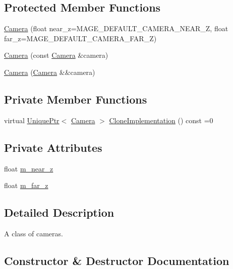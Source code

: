 \subsection*{Protected Member Functions}
\begin{DoxyCompactItemize}
\item 
\hyperlink{classmage_1_1_camera_ae734b9b92203a384410e83f117fa4427}{Camera} (float near\+\_\+z=M\+A\+G\+E\+\_\+\+D\+E\+F\+A\+U\+L\+T\+\_\+\+C\+A\+M\+E\+R\+A\+\_\+\+N\+E\+A\+R\+\_\+Z, float far\+\_\+z=M\+A\+G\+E\+\_\+\+D\+E\+F\+A\+U\+L\+T\+\_\+\+C\+A\+M\+E\+R\+A\+\_\+\+F\+A\+R\+\_\+Z)
\item 
\hyperlink{classmage_1_1_camera_a28d9280bd7067ec4d28392558cc2b767}{Camera} (const \hyperlink{classmage_1_1_camera}{Camera} \&camera)
\item 
\hyperlink{classmage_1_1_camera_a4dc6f31c108b28abe9580ef6d7a06713}{Camera} (\hyperlink{classmage_1_1_camera}{Camera} \&\&camera)
\end{DoxyCompactItemize}
\subsection*{Private Member Functions}
\begin{DoxyCompactItemize}
\item 
virtual \hyperlink{namespacemage_a3316d7143a973e37adf1110f2e80ca31}{Unique\+Ptr}$<$ \hyperlink{classmage_1_1_camera}{Camera} $>$ \hyperlink{classmage_1_1_camera_aedf6e7d6ee6c6e9e82da814ef8e705ab}{Clone\+Implementation} () const =0
\end{DoxyCompactItemize}
\subsection*{Private Attributes}
\begin{DoxyCompactItemize}
\item 
float \hyperlink{classmage_1_1_camera_a685f8700a29d1f1eff2bec353c3ec970}{m\+\_\+near\+\_\+z}
\item 
float \hyperlink{classmage_1_1_camera_abe2eeca725ce3da238256007454b241f}{m\+\_\+far\+\_\+z}
\end{DoxyCompactItemize}


\subsection{Detailed Description}
A class of cameras. 

\subsection{Constructor \& Destructor Documentation}
\hypertarget{classmage_1_1_camera_aa4718c93578d160299bdc24039cc256f}{}\label{classmage_1_1_camera_aa4718c93578d160299bdc24039cc256f} 
